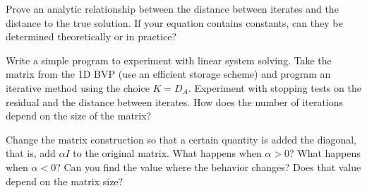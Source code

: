 \begin{exercise}
  Prove an analytic relationship between the distance between iterates
  and the distance to the true solution. If your equation contains
  constants, can they be determined theoretically or in practice?
\end{exercise}

\begin{exercise}
    Write a simple program to experiment with linear system
    solving. Take the matrix from the 1D BVP (use an efficient storage
    scheme) and program an iterative
    method using the choice $K=D_A$. Experiment with stopping tests on
    the residual and the distance between iterates.
    How does the number of iterations
    depend on the size of the matrix?

    Change the matrix construction so that a certain quantity is
    added the diagonal, that is, add $\alpha I$ to the original
    matrix. What happens when $\alpha>0$? What happens when
    $\alpha<0$? Can you find the value where the behavior changes?
    Does that value depend on the matrix size?
\end{exercise}

